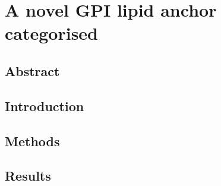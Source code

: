 
\chapter{A novel GPI lipid anchor categorised} %
\section{Abstract}
\section{Introduction}
\section{Methods}
\section{Results}
